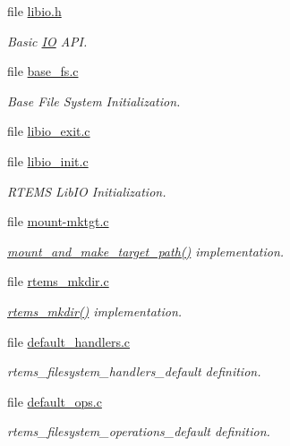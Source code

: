 \begin{DoxyCompactItemize}
\item 
file \mbox{\hyperlink{libio_8h}{libio.\+h}}
\begin{DoxyCompactList}\small\item\em Basic \mbox{\hyperlink{structIO}{IO}} A\+PI. \end{DoxyCompactList}\item 
file \mbox{\hyperlink{base__fs_8c}{base\+\_\+fs.\+c}}
\begin{DoxyCompactList}\small\item\em Base File System Initialization. \end{DoxyCompactList}\item 
file \mbox{\hyperlink{libio__exit_8c}{libio\+\_\+exit.\+c}}
\item 
file \mbox{\hyperlink{libio__init_8c}{libio\+\_\+init.\+c}}
\begin{DoxyCompactList}\small\item\em R\+T\+E\+MS Lib\+IO Initialization. \end{DoxyCompactList}\item 
file \mbox{\hyperlink{mount-mktgt_8c}{mount-\/mktgt.\+c}}
\begin{DoxyCompactList}\small\item\em \mbox{\hyperlink{group__FileSystemTypesAndMount_ga27af6440b4ef795576c94e870c5d997f}{mount\+\_\+and\+\_\+make\+\_\+target\+\_\+path()}} implementation. \end{DoxyCompactList}\item 
file \mbox{\hyperlink{rtems__mkdir_8c}{rtems\+\_\+mkdir.\+c}}
\begin{DoxyCompactList}\small\item\em \mbox{\hyperlink{group__LibIO_gad15bb6c81ba9ed35ec75103d13bde734}{rtems\+\_\+mkdir()}} implementation. \end{DoxyCompactList}\item 
file \mbox{\hyperlink{default__handlers_8c}{default\+\_\+handlers.\+c}}
\begin{DoxyCompactList}\small\item\em rtems\+\_\+filesystem\+\_\+handlers\+\_\+default definition. \end{DoxyCompactList}\item 
file \mbox{\hyperlink{default__ops_8c}{default\+\_\+ops.\+c}}
\begin{DoxyCompactList}\small\item\em rtems\+\_\+filesystem\+\_\+operations\+\_\+default definition. \end{DoxyCompactList}\end{DoxyCompactItemize}
